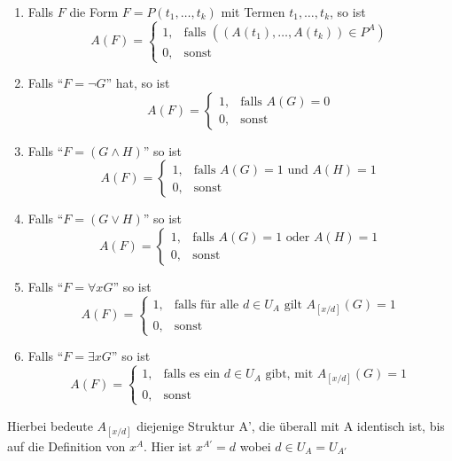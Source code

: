 \documentclass[a4paper,twoside,DIV15,BCOR12mm]{scrbook}
\begin{document}
\begin{enumerate}
\item Falls $F$ die Form $F=P(t_1, \ldots, t_k)$ mit Termen $t_1, \ldots, t_k$, so ist \[A(F)=
	\begin{cases}
	1, & \text{falls } ((A(t_1), \ldots, A(t_k)) \in P^A) \\
	0, & \text{sonst }
	\end{cases}\]
\item Falls "`$F = \neg G$"' hat, so ist \[ A(F)=
	\begin{cases}
	1, & \text{falls $A(G)=0$} \\
	0, & \text{sonst}
	\end{cases}\]
\item Falls "`$F=(G \wedge H)$"' so ist \[ A(F)=
	\begin{cases}
	1, & \text{falls $A(G)=1$ und $A(H)=1$} \\
	0, & \text{sonst}
	\end{cases}\]
\item Falls "`$F=(G \vee H)$"' so ist \[ A(F)=
	\begin{cases}
	1, & \text{falls $A(G)=1$ oder $A(H)=1$} \\
	0, & \text{sonst}
	\end{cases}\]
\item Falls "`$F=\forall xG$"' so ist \[ A(F)=
	\begin{cases}
	1, & \text{falls für alle $d \in U_A$ gilt $A_{[x/d]}(G)=1$} \\
	0, & \text{sonst}
	\end{cases}\]
\item Falls "`$F=\exists xG$"' so ist \[ A(F)=
	\begin{cases}
	1, & \text{falls es ein $d \in U_A$ gibt, mit $A_{[x/d]}(G)=1$}\\
	0, & \text{sonst}
	\end{cases}\]
\end{enumerate}

Hierbei bedeute $A_{[x/d]}$ diejenige Struktur A', die überall mit A identisch ist, bis auf die Definition von $x^A$. Hier ist $x^{A'}=d$ wobei $d \in U_A = U_{A'}$
\end{document}
